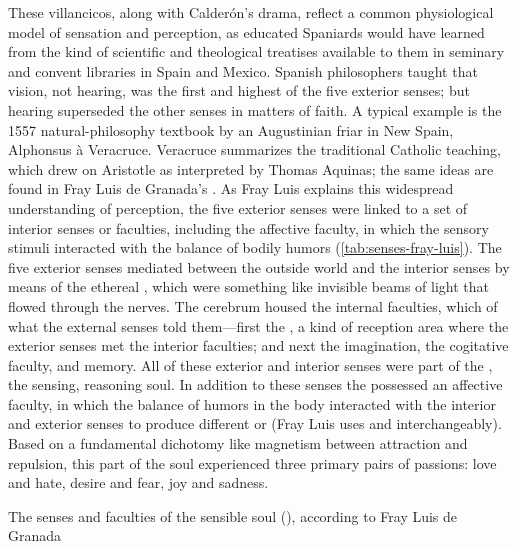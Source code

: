 These villancicos, along with Calderón's drama, reflect a common physiological
model of sensation and perception, as educated Spaniards would have learned
from the kind of scientific and theological treatises available to them in
seminary and convent libraries in Spain and Mexico.
Spanish philosophers taught that vision, not hearing, was the first and highest
of the five exterior senses; but hearing superseded the other senses in matters
of faith.
A typical example is the 1557 natural-philosophy textbook  by an Augustinian friar in New Spain, Alphonsus à Veracruce.%
    \Autocite{Veracruce:Phisica}
Veracruce summarizes the traditional Catholic teaching, which drew on Aristotle
as interpreted by Thomas Aquinas; the same ideas are found in Fray Luis de
Granada's .
As Fray Luis explains this widespread understanding of perception, the five
exterior senses were linked to a set of interior senses or faculties, including
the affective faculty, in which the sensory stimuli interacted with the balance
of bodily humors (\cref{tab:senses-fray-luis}).%
    \Autocite
    [, ]
    {LuisdeGranada-Balcells:SimboloPtI}
The five exterior senses mediated between the outside world and the interior
senses by means of the ethereal , which were something
like invisible beams of light that flowed through the nerves.  
The cerebrum housed the internal faculties, which  of what
the external senses told them---first the , a kind of
reception area where the exterior senses met the interior faculties; and next
the imagination, the cogitative faculty, and memory.
All of these exterior and interior senses were part of the , the sensing, reasoning soul.
In addition to these senses the  possessed an affective
faculty, in which the balance of humors in the body interacted with the interior
and exterior senses to produce different  or 
(Fray Luis uses  and  interchangeably).
Based on a fundamental dichotomy like magnetism between attraction and
repulsion, this  part of the soul experienced three
primary pairs of passions: love and hate, desire and fear, joy and sadness.

{The senses and faculties of the sensible soul (),
according to Fray Luis de Granada}

